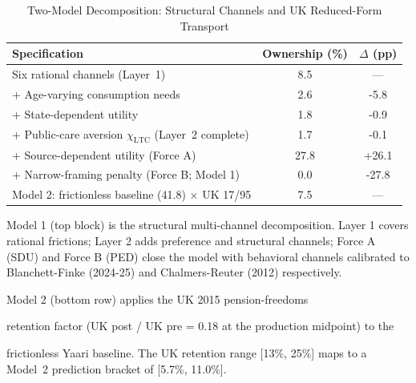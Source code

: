 \begin{table}[htbp]
\centering
\caption{Two-Model Decomposition: Structural Channels and UK Reduced-Form Transport}
\label{tab:extension_path}
\begin{threeparttable}
\begin{tabular}{lcc}
\toprule
Specification & Ownership (\%) & $\Delta$ (pp) \\
\midrule
Six rational channels (Layer~1)              & 8.5 & --- \\
+ Age-varying consumption needs              & 2.6 & -5.8 \\
+ State-dependent utility                    & 1.8 & -0.9 \\
+ Public-care aversion $\chi_{\text{LTC}}$ (Layer~2 complete)         & 1.7 & -0.1 \\
+ Source-dependent utility (Force A)         & 27.8 & +26.1 \\
+ Narrow-framing penalty (Force B; Model 1) & 0.0 & -27.8 \\
\midrule
Model 2: frictionless baseline (41.8) $\times$ UK 17/95 & 7.5 & --- \\
\bottomrule
\end{tabular}
\begin{tablenotes}
\small
\item Model 1 (top block) is the structural multi-channel decomposition.
Layer 1 covers rational frictions; Layer 2 adds preference and structural
channels; Force A (SDU) and Force B (PED) close the model with behavioral
channels calibrated to Blanchett-Finke (2024-25) and Chalmers-Reuter (2012)
respectively.
\item Model 2 (bottom row) applies the UK 2015 pension-freedoms
\item retention factor (UK post / UK pre = 0.18 at the production midpoint) to the
\item frictionless Yaari baseline. The UK retention range [13\%, 25\%] maps to a Model~2 prediction bracket of [5.7\%, 11.0\%].
\end{tablenotes}
\end{threeparttable}
\end{table}
